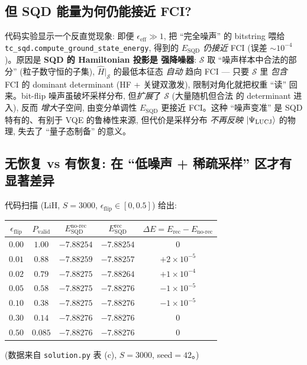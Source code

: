 \documentclass[11pt]{article}
\begin{document}
\subsection*{但 SQD 能量为何仍能接近 FCI?}
代码实验显示一个反直觉现象: 即便 $\epsilon_{\text{eff}}\gg1$, 把 ``完全噪声'' 的
bitstring 喂给 \texttt{tc\_sqd.compute\_ground\_state\_energy}, 得到的 $E_{\text{SQD}}$
\emph{仍接近} FCI (误差 $\sim 10^{-4}$)。原因是 \textbf{SQD 的 Hamiltonian 投影是
强降噪器}: $\mathcal{S}$ 取 ``噪声样本中合法的部分'' (粒子数守恒的子集),
$\hat H|_{\mathcal{S}}$ 的最低本征态 \emph{自动} 趋向 FCI --- 只要 $\mathcal{S}$ 里
\emph{包含} FCI 的 dominant determinant (HF + 关键双激发), 限制对角化就把权重 ``读''
回来。bit-flip 噪声虽破坏采样分布, 但\emph{扩展}了 $\mathcal{S}$ (大量随机但合法
的 determinant 进入), 反而 \emph{增大}子空间, 由变分单调性 $E_{\text{SQD}}$ 更接近
FCI。这种 ``噪声变准'' 是 SQD 特有的、有别于 VQE 的鲁棒性来源, 但代价是采样分布
\emph{不再反映} $\ket{\Psi_{\text{LUCJ}}}$ 的物理, 失去了 ``量子态制备'' 的意义。

\subsection*{无恢复 vs 有恢复: 在 ``低噪声 + 稀疏采样'' 区才有显著差异}
代码扫描 (LiH, $S{=}3000$, $\epsilon_{\text{flip}}\in[0,0.5]$) 给出:
\begin{center}
\begin{tabular}{c|cccc}
$\epsilon_{\text{flip}}$ & $P_{\text{valid}}$ & $E_{\text{SQD}}^{\text{no-rec}}$ &
$E_{\text{SQD}}^{\text{rec}}$ & $\Delta E=E_{\text{rec}}-E_{\text{no-rec}}$ \\
\hline
$0.00$ & $1.00$ & $-7.88254$ & $-7.88254$ & $0$ \\
$0.01$ & $0.88$ & $-7.88259$ & $-7.88257$ & $+2{\times}10^{-5}$ \\
$0.02$ & $0.79$ & $-7.88275$ & $-7.88264$ & $+1{\times}10^{-4}$ \\
$0.05$ & $0.58$ & $-7.88275$ & $-7.88276$ & $-1{\times}10^{-5}$ \\
$0.10$ & $0.38$ & $-7.88275$ & $-7.88276$ & $-1{\times}10^{-5}$ \\
$0.30$ & $0.14$ & $-7.88276$ & $-7.88276$ & $0$ \\
$0.50$ & $0.085$ & $-7.88276$ & $-7.88276$ & $0$
\end{tabular}
\end{center}
(数据来自 \texttt{solution.py} 表 (c), $S{=}3000$, seed${=}42$。)
\end{document}
